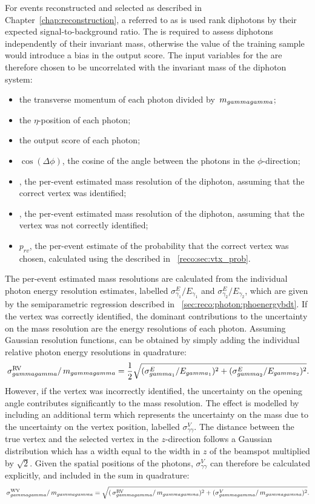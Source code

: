 For events reconstructed and selected as described in Chapter~\ref{chap:reconstruction}, a \BDT referred to as \DiPhoBdt is used rank diphotons by their expected signal-to-background ratio. The \DiPhoBdt is required to assess diphotons independently of their invariant mass, otherwise the \mH value of the training sample would introduce a bias in the output score. The input variables for the \DiPhoBdt are therefore chosen to be uncorrelated with the invariant mass of the diphoton system:

\begin{itemize}
\item the transverse momentum of each photon divided by $\,m_{gammagamma}$; %
\item the $\eta$-position of each photon;
\item the \PhoIdBdt output score of each photon;
\item $\cos(\Delta\phi)$, the cosine of the angle between the photons in the $\phi$-direction;
\item \sigmarv, the per-event estimated mass resolution of the diphoton, assuming that the correct vertex was identified;
\item \sigmawv, the per-event estimated mass resolution of the diphoton, assuming that the vertex was not correctly identified;
\item $p_{rv}$, the per-event estimate of the probability that the correct vertex was chosen, calculated using the \VtxProbBdt described in \Sec~\ref{reco:sec:vtx_prob}.
\end{itemize}

The per-event estimated mass resolutions are calculated from the individual photon energy resolution estimates, labelled $\sigma^E_{\gamma_1}/E_{\gamma_1}$ and $\sigma^E_{\gamma_2}/E_{\gamma_2}$, which are given by the semiparametric regression \PhoEnergyBdt described in \Sec~\ref{sec:reco:photon:phoenergybdt}. If the vertex was correctly identified, the dominant contributions to the uncertainty on the mass resolution are the energy resolutions of each photon. Assuming Gaussian resolution functions, \sigmarv can be obtained by simply adding the individual relative photon energy resolutions in quadrature:
\begin{equation}
\,\sigma^\text{RV}_{gammagamma}/\,m_{gammagamma}= \frac{1}{2} \sqrt{({\sigma^E_{gamma_1}}/{E_{gamma_1}})^2 +({\sigma^E_{gamma_2}}/{E_{gamma_2}})^2 }.
\end{equation} 
However, if the vertex was incorrectly identified, the uncertainty on the opening angle contributes significantly to the mass resolution. The effect is modelled by including an additional term which represents the uncertainty on the mass due to the uncertainty on the vertex position, labelled $\sigma^V_{\gamma\gamma}$. The distance between the true vertex and the selected vertex in the $z$-direction follows a Gaussian distribution which has a width equal to the width in $z$ of the beamspot multiplied by $\sqrt{2}$. Given the spatial positions of the photons, $\sigma^V_{\gamma\gamma}$ can therefore be calculated explicitly, and included in the sum in quadrature:
\begin{equation}
\,\sigma^\text{WV}_{gammagamma}/\,m_{gammagamma}= \sqrt{(\,\sigma^\text{RV}_{gammagamma}/\,m_{gammagamma})^2 +(\sigma^V_{gammagamma}/\,m_{gammagamma})^2 }.
\end{equation} 

